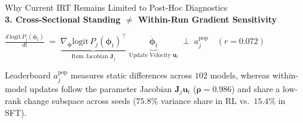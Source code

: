 \documentclass[aspectratio=169, 10pt]{beamer}
\begin{document}
\begin{frame}{Why Current IRT Remains Limited to Post-Hoc Diagnostics}
  \vspace{1.2mm}
  \noindent{\color{BorderGray}\rule{\linewidth}{0.4pt}}\\[1.0mm]
  \textbf{\color{NavyHeader}3. Cross-Sectional Standing $\neq$ Within-Run Gradient Sensitivity}\\[0.6mm]
  {\centering $\displaystyle \frac{d\,\mathrm{logit}\,P_j(\boldsymbol{\phi}_t)}{dt} \;=\; \underbrace{\nabla_{\boldsymbol{\phi}}\mathrm{logit}\,P_j(\boldsymbol{\phi}_t)^\top}_{\text{Item Jacobian }\boldsymbol{J}_j}\;\underbrace{\dot{\boldsymbol{\phi}}_t}_{\text{Update Velocity }\boldsymbol{u}_t} \;\perp\; a_j^{\mathrm{pop}} \quad (r = 0.072)$\par}\vspace{0.6mm}
  Leaderboard $a_j^{\mathrm{pop}}$ measures static differences across $102$ models, whereas within-model updates follow the parameter Jacobian $\boldsymbol{J}_j \boldsymbol{u}_t$ ($\boldsymbol{\rho = 0.986}$) and share a low-rank change subspace across seeds ($\mathbf{75.8\%}$ variance share in RL vs.\ $\mathbf{15.4\%}$ in SFT).\par
\end{frame}
\end{document}
